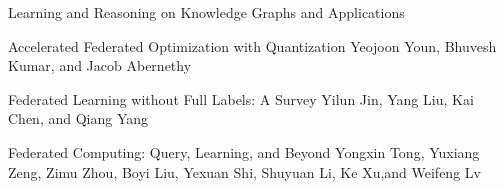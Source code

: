 \documentclass[11pt]{article}
\begin{document}
\begin{bulletin}
\begin{articlesection}{Learning and Reasoning on Knowledge Graphs and Applications}
\begin{article}
{Accelerated Federated Optimization with Quantization}
{Yeojoon Youn, Bhuvesh Kumar, and Jacob Abernethy}

\end{article}


\begin{article}
{Federated Learning without Full Labels: A Survey}
{Yilun Jin, Yang Liu, Kai Chen, and Qiang Yang}

\end{article}

\begin{article}
{Federated Computing: Query, Learning, and Beyond}
{Yongxin Tong, Yuxiang Zeng, Zimu Zhou, Boyi Liu, Yexuan Shi, Shuyuan Li, Ke Xu,and Weifeng Lv}

\end{article}



\end{articlesection}




%
%



\begin{callsection}


\end{callsection}
\end{bulletin}
\end{document}
